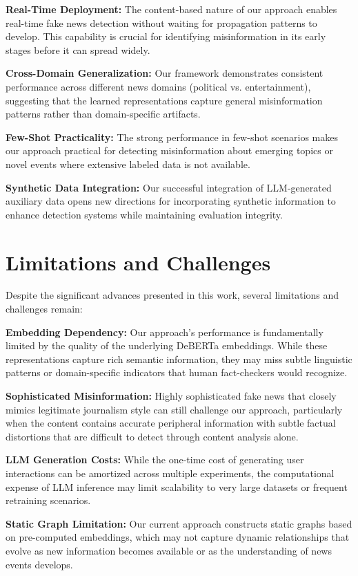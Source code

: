 \textbf{Real-Time Deployment:} The content-based nature of our approach enables real-time fake news detection without waiting for propagation patterns to develop. This capability is crucial for identifying misinformation in its early stages before it can spread widely.

\textbf{Cross-Domain Generalization:} Our framework demonstrates consistent performance across different news domains (political vs. entertainment), suggesting that the learned representations capture general misinformation patterns rather than domain-specific artifacts.

\textbf{Few-Shot Practicality:} The strong performance in few-shot scenarios makes our approach practical for detecting misinformation about emerging topics or novel events where extensive labeled data is not available.

\textbf{Synthetic Data Integration:} Our successful integration of LLM-generated auxiliary data opens new directions for incorporating synthetic information to enhance detection systems while maintaining evaluation integrity.

\section{Limitations and Challenges}

Despite the significant advances presented in this work, several limitations and challenges remain:

\textbf{Embedding Dependency:} Our approach's performance is fundamentally limited by the quality of the underlying DeBERTa embeddings. While these representations capture rich semantic information, they may miss subtle linguistic patterns or domain-specific indicators that human fact-checkers would recognize.

\textbf{Sophisticated Misinformation:} Highly sophisticated fake news that closely mimics legitimate journalism style can still challenge our approach, particularly when the content contains accurate peripheral information with subtle factual distortions that are difficult to detect through content analysis alone.

\textbf{LLM Generation Costs:} While the one-time cost of generating user interactions can be amortized across multiple experiments, the computational expense of LLM inference may limit scalability to very large datasets or frequent retraining scenarios.

\textbf{Static Graph Limitation:} Our current approach constructs static graphs based on pre-computed embeddings, which may not capture dynamic relationships that evolve as new information becomes available or as the understanding of news events develops.

